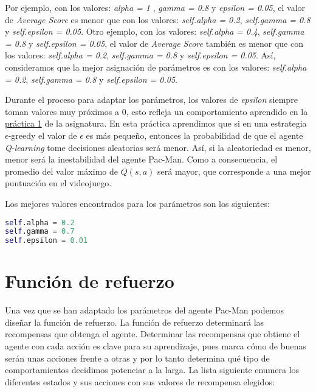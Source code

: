 \documentclass[11pt]{exam}
\begin{document}
Por ejemplo, con los valores: \textit{alpha = 1} , \textit{gamma = 0.8} y \textit{epsilon = 0.05}, el valor de \textit{Average Score} es menor que con los valores: \textit{self.alpha = 0.2}, \textit{self.gamma = 0.8} y \textit{self.epsilon = 0.05}. Otro ejemplo, con los valores: \textit{self.alpha = 0.4}, \textit{self.gamma = 0.8} y \textit{self.epsilon = 0.05}, el valor de \textit{Average Score} también es menor que con los valores: \textit{self.alpha = 0.2}, \textit{self.gamma = 0.8} y \textit{self.epsilon = 0.05}. Así, consideramos que la mejor asignación de parámetros es con los valores: \textit{self.alpha = 0.2}, \textit{self.gamma = 0.8} y \textit{self.epsilon = 0.05}.

Durante el proceso para adaptar los parámetros, los valores de \textit{epsilon} siempre toman valores muy próximos a 0, esto refleja un comportamiento aprendido en la \href{https://poliformat.upv.es/portal/site/ESP_0_2835/tool/c07b745a-0cfd-44f0-a7a2-9bb22f80c3f7?panel=Main}{práctica 1} de la asignatura. En esta práctica aprendimos que si en una estrategia $\epsilon$-greedy el valor de $\epsilon$ es más pequeño, entonces la probabilidad de que el agente \textit{Q-learning} tome decisiones aleatorias será menor. Así, si la aleatoriedad es menor, menor será la inestabilidad del agente Pac-Man. Como a consecuencia, el promedio del valor máximo de $Q(s,a)$ será mayor, que corresponde a una mejor puntuación en el videojuego.

Los mejores valores encontrados para los parámetros son los siguientes:
\vspace*{3mm}

\begin{lstlisting}[language=python, basicstyle=\footnotesize]
self.alpha = 0.2
self.gamma = 0.7
self.epsilon = 0.01
\end{lstlisting}

\section{Función de refuerzo}\label{refuerzo}

Una vez que se han adaptado los parámetros del agente Pac-Man podemos diseñar la función de refuerzo. La función de refuerzo determinará las recompensas que obtenga el agente. Determinar las recompensas que obtiene el agente con cada acción es clave para su aprendizaje, pues marca cómo de buenas serán unas acciones frente a otras y por lo tanto determina qué tipo de comportamientos decidimos potenciar a la larga. La lista siguiente enumera los diferentes estados y sus acciones con sus valores de recompensa elegidos:
\end{document}
